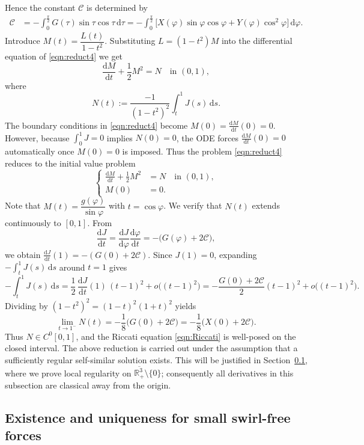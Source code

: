 \documentclass{amsart}
\newcommand{\mcC}{\mathcal{C}}
\begin{document}
Hence the constant $\mcC$ is determined by
\begin{align*}
\mcC 
&= -\int_0^{\frac{\pi}{2}} G(\tau) \sin\tau \cos\tau \, \mathrm{d}\tau
=-\int_0^{\frac{\pi}{2}} \Big[X(\varphi) \sin \varphi \cos \varphi + Y(\varphi) \cos^2 \varphi \Big] \, \mathrm{d}\varphi.
\end{align*}
Introduce $M(t) = \dfrac{L(t)}{1-t^2}$. Substituting $L = (1-t^2)M$ into the differential equation of \eqref{eqn:reduct4} we get
\[
\frac{\mathrm{d} M}{\mathrm{d} t} + \frac12 M^2 = N \quad\text{in } (0,1),
\]
where
\[
N(t):= \frac{-1}{(1-t^2)^2} \int_t^1 J(s) \, \mathrm{d} s.
\]
The boundary conditions in \eqref{eqn:reduct4} become $M(0)=\frac{\mathrm{d} M}{\mathrm{d} t}(0)=0$. However, because $\int_0^1 J=0$ implies $N(0)=0$, the ODE forces $\frac{\mathrm{d} M}{\mathrm{d} t}(0)=0$ automatically once $M(0)=0$ is imposed. Thus the problem \eqref{eqn:reduct4} reduces to the initial value problem
\begin{equation}\label{eqn:Riccati}
\left\{
\begin{aligned}
\frac{\mathrm{d} M}{\mathrm{d} t} + \frac12 M^2 &= N \quad \text{in } (0,1), \\
M(0)&=0.
\end{aligned}
\right.
\end{equation}
Note that $M(t)=\dfrac{g(\varphi)}{\sin\varphi}$ with $t=\cos\varphi$.
We verify that $N(t)$ extends continuously to $[0,1]$.  From
\[
\frac{\mathrm{d} J}{\mathrm{d} t}
= \frac{\mathrm{d} J}{\mathrm{d}\varphi}\frac{\mathrm{d}\varphi}{\mathrm{d} t}
= -\bigl(G(\varphi)+2\mcC\bigr),
\]
we obtain $\frac{\mathrm{d} J}{\mathrm{d} t}(1)=-(G(0)+2\mcC)$.  Since $J(1)=0$, expanding $-\int_t^1 J(s)\,\mathrm{d}s$ around $t=1$ gives
\[
-\int_t^1 J(s)\,\mathrm{d}s
= \frac12 \, \frac{\mathrm{d} J}{\mathrm{d} t}(1)\,(t-1)^2 + o\bigl((t-1)^2\bigr)
= -\frac{G(0)+2\mcC}{2}(t-1)^2 + o\bigl((t-1)^2\bigr).
\]
Dividing by $(1-t^2)^2=(1-t)^2(1+t)^2$ yields
\[
\lim_{t\to 1^-} N(t) = -\frac{1}{8}\bigl(G(0)+2\mcC\bigr)
= -\frac{1}{8}\bigl(X(0)+2\mcC\bigr).
\]
Thus $N\in C^0[0,1]$, and the Riccati equation \eqref{eqn:Riccati} is well-posed on the closed interval.
The above reduction is carried out under the assumption that a sufficiently regular self-similar solution exists. This will be justified in Section~\ref{sec:EUNo-swirl}, where we prove local regularity on $\overline{\mathbb R^3_+}\setminus\{0\}$; consequently all derivatives in this subsection are classical away from the origin.


\subsection{Existence and uniqueness for small swirl-free forces}\label{sec:EUNo-swirl}
\end{document}
